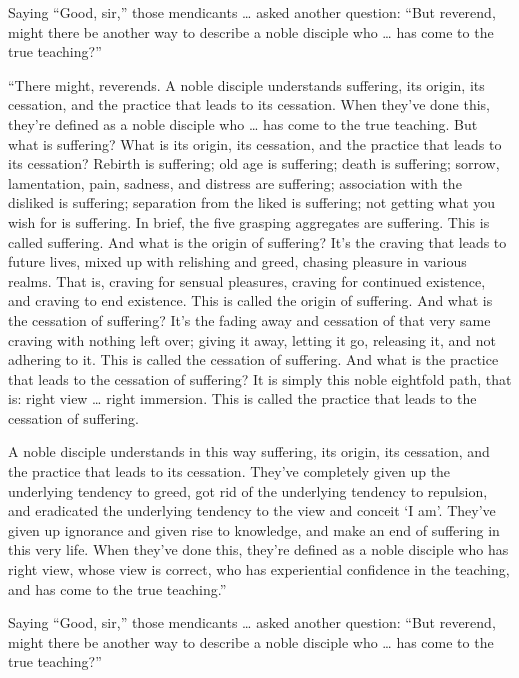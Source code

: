 \documentclass[12pt,openany]{book}%
\begin{document}
Saying “Good, sir,” those mendicants … asked another question: “But reverend, might there be another way to describe a noble disciple who … has come to the true teaching?” 

“There might, reverends. A noble disciple understands suffering, its origin, its cessation, and the practice that leads to its cessation. When they’ve done this, they’re defined as a noble disciple who … has come to the true teaching. But what is suffering? What is its origin, its cessation, and the practice that leads to its cessation? Rebirth is suffering; old age is suffering; death is suffering; sorrow, lamentation, pain, sadness, and distress are suffering; association with the disliked is suffering; separation from the liked is suffering; not getting what you wish for is suffering. In brief, the five grasping aggregates are suffering. This is called suffering. And what is the origin of suffering? It’s the craving that leads to future lives, mixed up with relishing and greed, chasing pleasure in various realms. That is, craving for sensual pleasures, craving for continued existence, and craving to end existence. This is called the origin of suffering. And what is the cessation of suffering? It’s the fading away and cessation of that very same craving with nothing left over; giving it away, letting it go, releasing it, and not adhering to it. This is called the cessation of suffering. And what is the practice that leads to the cessation of suffering? It is simply this noble eightfold path, that is: right view … right immersion. This is called the practice that leads to the cessation of suffering. 

A noble disciple understands in this way suffering, its origin, its cessation, and the practice that leads to its cessation. They’ve completely given up the underlying tendency to greed, got rid of the underlying tendency to repulsion, and eradicated the underlying tendency to the view and conceit ‘I am’. They’ve given up ignorance and given rise to knowledge, and make an end of suffering in this very life. When they’ve done this, they’re defined as a noble disciple who has right view, whose view is correct, who has experiential confidence in the teaching, and has come to the true teaching.” 

Saying “Good, sir,” those mendicants … asked another question: “But reverend, might there be another way to describe a noble disciple who … has come to the true teaching?” 
\end{document}
